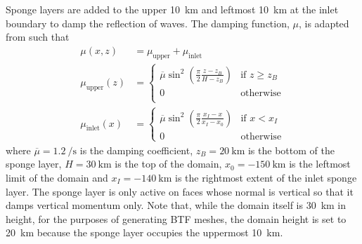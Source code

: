 Sponge layers are added to the upper \SI{10}{\kilo\meter} and leftmost \SI{10}{\kilo\meter} at the inlet boundary to damp the reflection of waves.
The damping function, \(\mu\), is adapted from \citet{melvin2010} such that
\begin{align}
	\mu(x, z) &= \mu_\mathrm{upper} + \mu_\mathrm{inlet} \\
	\mu_\mathrm{upper}(z) &= \begin{cases}
		\overline{\mu} \sin^2 \left( \frac{\pi}{2} \frac{z - z_B}{H - z_B} \right) & \text{if } z \geq z_B \\
		0 & \text{otherwise} \\
	\end{cases} \\
	\mu_\mathrm{inlet}(x) &= \begin{cases}
		\overline{\mu} \sin^2 \left( \frac{\pi}{2} \frac{x_I - x}{x_I - x_0} \right) & \text{if } x < x_I \\
		0 & \text{otherwise}
	\end{cases}
\end{align}
where $\overline{\mu} = \SI{1.2}{\per\second}$ is the damping coefficient, $z_B = \SI{20}{\kilo\meter}$ is the bottom of the sponge layer, $H = \SI{30}{\kilo\meter}$ is the top of the domain, $x_0 = \SI{-150}{\kilo\meter}$ is the leftmost limit of the domain and $x_I = \SI{-140}{\kilo\meter}$ is the rightmost extent of the inlet sponge layer.  The sponge layer is only active on faces whose normal is vertical so that it damps vertical momentum only.
Note that, while the domain itself is \SI{30}{\kilo\meter} in height, for the purposes of generating BTF meshes, the domain height is set to \SI{20}{\kilo\meter} because the sponge layer occupies the uppermost \SI{10}{\kilo\meter}.

